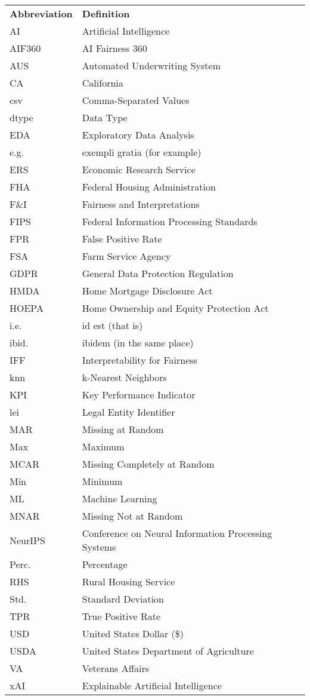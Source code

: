 \documentclass[
	12pt, 
	a4paper, 
	oneside,
	parskip=half*, %
	openany,  %
	listof=totoc, %
	bibliography=totoc, %
	index=totoc, %
  toc=chapterentrywithdots, %
  numbers=noenddot, %
]{scrbook}
\begin{document}
\setlength{\LTleft}{-0.45em}  %

\begin{longtable}{ll}
\large\textbf{Abbreviation} & \large\textbf{Definition} \\
AI & Artificial Intelligence \\
AIF360 & AI Fairness 360 \\
AUS & Automated Underwriting System \\
CA & California \\
csv & Comma-Separated Values \\
dtype & Data Type \\
EDA & Exploratory Data Analysis \\
e.g. & exempli gratia (for example) \\
ERS & Economic Research Service \\
FHA & Federal Housing Administration \\
F\&I & Fairness and Interpretations \\
FIPS & Federal Information Processing Standards \\
FPR & False Positive Rate \\
FSA & Farm Service Agency \\
GDPR & General Data Protection Regulation \\
HMDA & Home Mortgage Disclosure Act \\
HOEPA & Home Ownership and Equity Protection Act \\
i.e. & id est (that is) \\
ibid. & ibidem (in the same place) \\
IFF & Interpretability for Fairness \\
knn & k-Nearest Neighbors \\
KPI & Key Performance Indicator \\
lei & Legal Entity Identifier \\
MAR & Missing at Random \\
Max & Maximum \\
MCAR & Missing Completely at Random \\
Min & Minimum \\
ML & Machine Learning \\
MNAR & Missing Not at Random \\
NeurIPS & Conference on Neural Information Processing Systems \\
Perc. & Percentage \\
RHS & Rural Housing Service \\
Std. & Standard Deviation \\
TPR & True Positive Rate \\
USD & United States Dollar (\$) \\
USDA & United States Department of Agriculture \\
VA & Veterans Affairs \\
xAI & Explainable Artificial Intelligence \\
\end{longtable}




\mainmatter
\setcounter{page}{1}

%
%


\printbibliography
\end{document}
